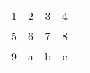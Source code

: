 \documentclass{article}
\begin{document}
\begin{table}
    \centering
    \begin{tabular}{ccccc}
        1 & 2 & 3 & 4 & \\
        5 & 6 & 7 & 8 & \\
        9 & a & b & c & \\
    \end{tabular}
    \label{tab:my_label}
\end{table}
\end{document}
